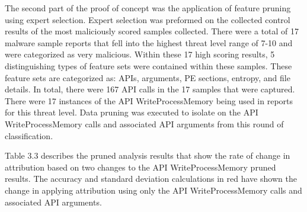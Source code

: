 \documentclass[12pt]{report}
\begin{document}
The second part of the proof of concept was the application of feature pruning using expert selection.  Expert selection was preformed on the collected control results of the most maliciously scored samples collected.  There were a total of 17 malware sample reports that fell into the highest threat level range of 7-10 and were categorized as very malicious.  Within these 17 high scoring results, 5 distinguishing types of feature sets were contained within these samples.  These feature sets are categorized as: APIs, arguments, PE sections, entropy, and file details.  In total, there were 167 API calls in the 17 samples that were captured.  There were 17 instances of the API WriteProcessMemory being used in reports for this threat level.  Data pruning was executed to isolate on the API WriteProcessMemory calls and associated API arguments from this round of classification.

Table 3.3 describes the pruned analysis results that show the rate of change in attribution based on two changes to the API WriteProcessMemory pruned results.  The accuracy and standard deviation calculations in red have shown the change in applying attribution using only the API WriteProcessMemory calls and associated API arguments.  
\end{document}
